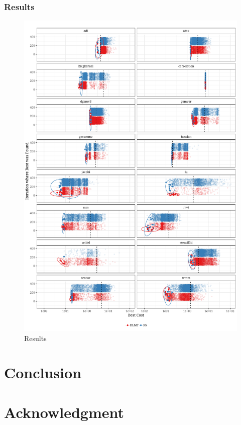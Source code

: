 \documentclass[conference]{IEEEtran}
\begin{document}
\subsubsection{Results}
\label{sec:org3a54bb9}
\begin{center}
\begin{figure}[ht]
\centering
\includegraphics[width=.95\textwidth]{./img/iteration_best_comparison.pdf}
\caption{Results}
\end{figure}
\end{center}
\section{Conclusion}
\label{sec:orgcf0774c}
\section*{Acknowledgment}
\label{sec:orgcb4cec9}


\end{document}
